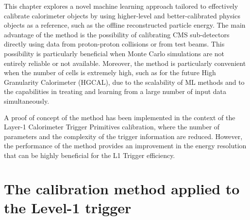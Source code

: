 This chapter explores a novel machine learning approach tailored to effectively calibrate calorimeter objects by using higher-level and better-calibrated physics objects as a reference, such as the offline reconstructed particle energy.
The main advantage of the method is the possibility of calibrating CMS sub-detectors directly using data from proton-proton collisions or from test beams. This possibility is particularly beneficial when Monte Carlo simulations are not entirely reliable or not available.
Moreover, the method is particularly convenient when the number of cells is extremely high, such as for the future High Granularity Calorimeter (HGCAL), due to the scalability of ML methods and to the capabilities in treating and learning from a large number of input data simultaneously.

A proof of concept of the method has been implemented in the context of the Layer-1 Calorimeter Trigger Primitives calibration, where the number of parameters and the complexity of the trigger information are reduced. However, the performance of the method provides an improvement in the energy resolution that can be highly beneficial for the L1 Trigger efficiency.



\section{The calibration method applied to the Level-1 trigger}
\label{sec:The calibration method applied to the Level-1 trigger}

